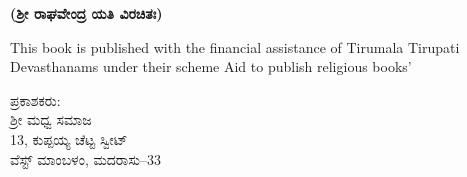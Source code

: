 \thispagestyle{empty}


\begin{center}
\textbf{(ಶ‍್ರೀ ರಾಘವೇಂದ್ರ ಯತಿ ವಿರಚಿತಃ)}
\end{center}


\begin{center}
This book is published with the financial assistance of Tirumala Tirupati Devasthanams under their scheme Aid to publish religious books'
\end{center}

\begin{center}
ಪ್ರಕಾಶಕರು: \\ ಶ‍್ರೀ ಮಧ್ವ ಸಮಾಜ \\ 13, ಕುಪ್ಪಯ್ಯ ಚೆಟ್ಟ ಸ್ವೀಟ್ \\ ವೆಸ್ಟ್ ಮಾಂಬಳಂ, ಮದರಾಸು–33
\end{center}

